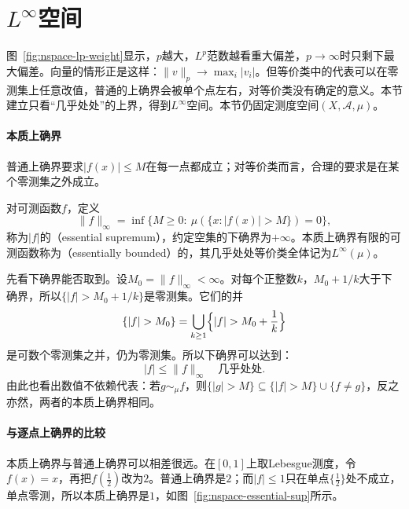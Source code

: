 \section{\texorpdfstring{$L^\infty$}{L-infinity}空间}
\label{sec:nspace-linfty-space}

图~\ref{fig:nspace-lp-weight}显示，$p$越大，$L^p$范数越看重大偏差，$p\to\infty$时只剩下最大偏差。向量的情形正是这样：$\lVert v\rVert_p\to\max_i\lvert v_i\rvert$。但等价类中的代表可以在零测集上任意改值，普通的上确界会被单个点左右，对等价类没有确定的意义。本节建立只看“几乎处处”的上界，得到$L^\infty$空间。本节仍固定测度空间$(X,\mathcal A,\mu)$。

\paragraph{本质上确界}
普通上确界要求$\lvert f(x)\rvert\leq M$在每一点都成立；对等价类而言，合理的要求是在某个零测集之外成立。

\begin{definition}
\label{def:nspace-linfty}
对可测函数$f$，定义
\begin{equation}
 \lVert f\rVert_\infty=\inf\{M\geq0:\ \mu(\{x:\lvert f(x)\rvert>M\})=0\},
 \label{eq:nspace-esssup}
\end{equation}
称为$\lvert f\rvert$的（essential supremum），约定空集的下确界为$+\infty$。本质上确界有限的可测函数称为（essentially bounded）的，其几乎处处等价类全体记为$L^\infty(\mu)$。
\end{definition}

先看下确界能否取到。设$M_0=\lVert f\rVert_\infty<\infty$。对每个正整数$k$，$M_0+1/k$大于下确界，所以$\{\lvert f\rvert>M_0+1/k\}$是零测集。它们的并
\[
 \{\lvert f\rvert>M_0\}=\bigcup_{k\geq1}\Bigl\{\lvert f\rvert>M_0+\frac1k\Bigr\}
\]
是可数个零测集之并，仍为零测集。所以下确界可以达到：
\begin{equation}
 \lvert f\rvert\leq\lVert f\rVert_\infty\quad\text{几乎处处}.
 \label{eq:nspace-esssup-attained}
\end{equation}
由此也看出数值不依赖代表：若$g\sim_\mu f$，则$\{\lvert g\rvert>M\}\subseteq\{\lvert f\rvert>M\}\cup\{f\neq g\}$，反之亦然，两者的本质上确界相同。

\paragraph{与逐点上确界的比较}
本质上确界与普通上确界可以相差很远。在$[0,1]$上取Lebesgue测度，令$f(x)=x$，再把$f(\tfrac12)$改为$2$。普通上确界是$2$；而$\lvert f\rvert\leq1$只在单点$\{\tfrac12\}$处不成立，单点零测，所以本质上确界是$1$，如图~\ref{fig:nspace-essential-sup}所示。

